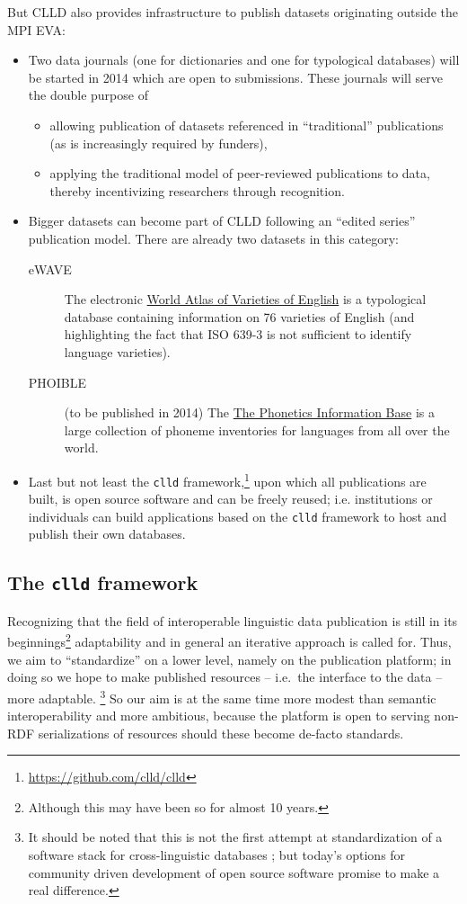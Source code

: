 \documentclass[a4paper,10pt]{article}
\begin{document}
But CLLD also provides infrastructure to publish datasets originating outside the MPI EVA:
\begin{itemize}
\item Two data journals (one for dictionaries and one for typological databases) will be started
in 2014 which are open to submissions. These journals will serve the double purpose of
\begin{itemize}
\item allowing publication of datasets referenced in ``traditional'' publications (as is
increasingly required by funders),
\item applying the traditional model of peer-reviewed publications to data, thereby incentivizing
researchers through recognition.
\end{itemize}
\item Bigger datasets can become part of CLLD following an ``edited series'' publication model.
There are already two datasets in this category:
\begin{description}
\item[eWAVE] The electronic \href{http://ewave-atlas.org/}{World Atlas of Varieties of English} is a typological database containing information on 76 varieties of English (and highlighting the fact that ISO 639-3 is not sufficient to identify language varieties).
\item[PHOIBLE] (to be published in 2014) The \href{http://phoible.org}{The Phonetics Information Base} is a large collection of phoneme inventories for languages from all over the world.
\end{description}
\item Last but not least the \texttt{clld} framework,\footnote{\url{https://github.com/clld/clld}}
upon which all publications are built, is open source software and can be freely reused; i.e.
institutions or individuals can build applications based on the \texttt{clld} framework to
host and publish their own databases.
\end{itemize}

\subsection{The \texttt{clld} framework}
Recognizing that the field of interoperable linguistic data publication is still in its
beginnings\footnote{Although this may have been so for almost 10 years.} adaptability and in general an
iterative approach is called for. Thus, we aim to ``standardize'' on a lower
level, namely on the publication platform; in doing so we hope to make published
resources -- i.e.~the interface to the data -- more adaptable.%
\footnote{It should be noted that this is not the first attempt at standardization of a software stack for cross-linguistic databases \cite{dimitriadis2002}; but today's options for community driven development of open source software promise to make a real difference.}
So our aim is at the same time more modest than
semantic interoperability and more ambitious, because the platform is open to serving non-RDF serializations
of resources should these become de-facto standards.
\end{document}
